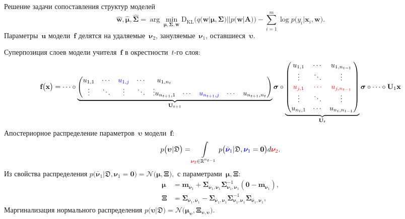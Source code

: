 \documentclass[10pt,pdf,hyperref={unicode}]{beamer}
\begin{document}
\begin{frame}{Решение задачи сопоставления структур моделей}\vspace{-.4cm}
\[
\hat{\textbf{w}}, \hat{\bm{\mu}}, \hat{\bm{\Sigma}} = \arg \min_{\bm{\mu}, \bm{\Sigma}, \textbf{w}} \text{D}_{\text{KL}}\bigr(q\bigr(\textbf{w}|\bm{\mu}, \bm{\Sigma}\bigr)||p\bigr(\textbf{w}|\textbf{A}\bigr)\bigr) - \sum_{i=1}^{m}\log p\bigr(y_i|\textbf{x}_{i}, \textbf{w}\bigr).
\]
Параметры~$\textbf{u}$ модели~$\textbf{f}$ делятся на {\color{red} удаляемые~$\bm{\nu}_2$}, {\color{blue} зануляемые~$\bm{\nu}_1$}, {оставшиеся~$\bm{\upsilon}$}.

Суперпозиция слоев модели учителя~$\textbf{f}$ в окрестности~$t$-го слоя:
{\small\[
\setlength\abovedisplayskip{0pt}
\textbf{f}\bigr(\textbf{x}\bigr) = \cdots \circ
\underbrace{
\begin{pmatrix}
u_{1,1} & \cdots & {\color{blue} u_{1,j}} & \cdots & u_{1,n_{t}} \\
\vdots  & \ddots & {\color{blue} \vdots}  & \ddots & \vdots 
u_{n_{t+1},1} & \cdots & {\color{blue} u_{n_{t+1},j}} & \cdots & u_{n_{t+1},n_{t}} \\
\end{pmatrix} 
}_{\textbf{U}_{t+1}}
\bm{\sigma} 
\circ 
\underbrace{
\begin{pmatrix}
u_{1,1} & \cdots & u_{1,n_{t-1}} \\
\vdots  & \ddots & \vdots        \\
{\color{red} u_{j,1}} & {\color{red}\cdots} & {\color{red} u_{j,n_{t-1}}} \\
\vdots  & \ddots & \vdots        \\
u_{n_{t},1} & \cdots & u_{n_{t},n_{t-1}} \\
\end{pmatrix}
}_{\textbf{U}_{t}}
\bm{\sigma}
\circ 
\cdots
\circ 
\textbf{U}_1
\textbf{x}
\setlength\belowdisplayskip{0pt}
\]}
Апостериорное распределение параметров~$\bm{\upsilon}$ модели~$\textbf{f}$:
\[
\setlength\abovedisplayskip{0pt}
p\bigr(\bm{\upsilon}|\mathfrak{D}\bigr)  = \int\limits_{{\color{red} \bm{\nu}_2} \in \mathbb{R}^{n_{t-1}}}p\bigr({\color{blue}\bar{\bm{\nu}}_1}|\mathfrak{D}, {\color{blue}\bm{\nu}_1}=\textbf{0}\bigr) d{\color{red} \bm{\nu}_2}.
\setlength\belowdisplayskip{0pt}
\]
Из свойства распределения 
$
    p\bigr(\bar{\bm{\nu}}_1|\mathfrak{D}, \bm{\nu}_1=\mathbf{0}\bigr) = \mathcal{N}\bigr(\bm{\mu}, \bm{\Xi}\bigr),
$
с параметрами~$\bm{\mu}, \bm{\Xi}$:
\[
\begin{aligned}
\bm{\mu} &= \mathbf{m}_{\bar{\bm{\nu}}_1}+\bm{\Sigma}_{\bar{\bm{\nu}}_1,\bm{\nu}_1} \bm{\Sigma}_{\bm{\nu}_1,\bm{\nu}_1}^{-1} \left(\mathbf{0} - \mathbf{m}_{\bm{\nu}_1}\right), \\
 \bm{\Xi} &= \bm{\Sigma}_{\bar{\bm{\nu}}_1,\bar{\bm{\nu}}_1} - \bm{\Sigma}_{\bar{\bm{\nu}}_1,\bm{\nu}_1} \bm{\Sigma}_{\bm{\nu}_1,\bm{\nu}_1}^{-1} \bm{\Sigma}_{\bar{\bm{\nu}}_1,\bm{\nu}_1},
\end{aligned}
\]
Маргинализация нормального распределения
$
p\bigr(\bm{\upsilon}|\mathfrak{D}\bigr) = \mathcal{N}\bigr(\bm{\mu}_{\bm{\upsilon}},  \bm{\Xi}_{\bm{\upsilon}, \bm{\upsilon}}\bigr).
$
\end{frame}
\end{document}
